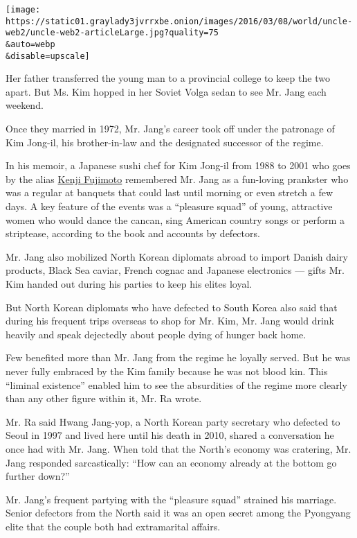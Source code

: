 \texttt{[image: https://static01.graylady3jvrrxbe.onion/images/2016/03/08/world/uncle-web2/uncle-web2-articleLarge.jpg?quality=75\\\&auto=webp\\\&disable=upscale]}

Her father transferred the young man to a provincial college to keep the
two apart. But Ms. Kim hopped in her Soviet Volga sedan to see Mr. Jang
each weekend.

Once they married in 1972, Mr. Jang's career took off under the
patronage of Kim Jong-il, his brother-in-law and the designated
successor of the regime.

In his memoir, a Japanese sushi chef for Kim Jong-il from 1988 to 2001
who goes by the alias
\href{http://www.nytimes3xbfgragh.onion/2012/08/25/world/asia/kim-family-chefs-redemption-suggests-a-softening-north-korea.html}{Kenji
Fujimoto} remembered Mr. Jang as a fun-loving prankster who was a
regular at banquets that could last until morning or even stretch a few
days. A key feature of the events was a ``pleasure squad'' of young,
attractive women who would dance the cancan, sing American country songs
or perform a striptease, according to the book and accounts by
defectors.

Mr. Jang also mobilized North Korean diplomats abroad to import Danish
dairy products, Black Sea caviar, French cognac and Japanese electronics
--- gifts Mr. Kim handed out during his parties to keep his elites
loyal.

But North Korean diplomats who have defected to South Korea also said
that during his frequent trips overseas to shop for Mr. Kim, Mr. Jang
would drink heavily and speak dejectedly about people dying of hunger
back home.

Few benefited more than Mr. Jang from the regime he loyally served. But
he was never fully embraced by the Kim family because he was not blood
kin. This ``liminal existence'' enabled him to see the absurdities of
the regime more clearly than any other figure within it, Mr. Ra wrote.

Mr. Ra said Hwang Jang-yop, a North Korean party secretary who defected
to Seoul in 1997 and lived here until his death in 2010, shared a
conversation he once had with Mr. Jang. When told that the North's
economy was cratering, Mr. Jang responded sarcastically: ``How can an
economy already at the bottom go further down?''

Mr. Jang's frequent partying with the ``pleasure squad'' strained his
marriage. Senior defectors from the North said it was an open secret
among the Pyongyang elite that the couple both had extramarital affairs.

